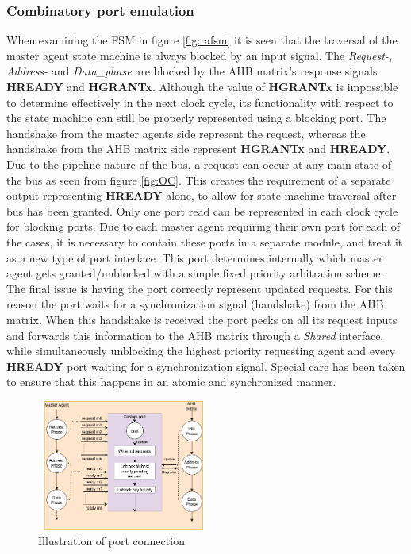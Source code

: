 \subsubsection{Combinatory port emulation}
When examining the FSM in figure \ref{fig:rafsm} it is seen that the traversal of the master agent state machine is always blocked by an input signal. The \textit{Request-}, \textit{Address-} and \textit{Data\_phase} are blocked by the AHB matrix's response signals \textbf{HREADY} and \textbf{HGRANTx}. Although the value of \textbf{HGRANTx} is impossible to determine effectively in the next clock cycle, its functionality with respect to the state machine can still be properly represented using a blocking port. The handshake from the master agents side represent the request, whereas the handshake from the AHB matrix side represent \textbf{HGRANTx} and \textbf{HREADY}. Due to the pipeline nature of the bus, a request can occur at any main state of the bus as seen from figure \ref{fig:OC}. This creates the requirement of a separate output representing \textbf{HREADY} alone, to allow for state machine traversal after bus has been granted. Only one port read can be represented in each clock cycle for blocking ports. Due to each master agent requiring their own port for each of the cases, it is necessary to contain these ports in a separate module, and treat it as a new type of port interface.
This port determines internally which master agent gets granted/unblocked with a simple fixed priority arbitration scheme. The final issue is having the port correctly represent updated requests. For this reason the port waits for a synchronization signal (handshake) from the AHB matrix. When this handshake is received the port peeks on all its request inputs and forwards this information to the AHB matrix through a \textit{Shared} interface, while simultaneously unblocking the highest priority requesting agent and every \textbf{HREADY} port waiting for a synchronization signal. Special care has been taken to ensure that this happens in an atomic and synchronized manner.   
\begin{figure}
\includegraphics[width=5.5cm]{figs/ESL/port_diagram.png}
\caption{Illustration of port connection}\label{fig:cport}
\end{figure}

